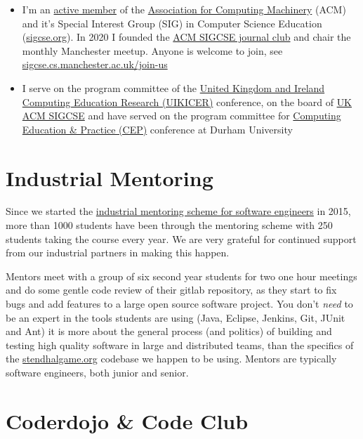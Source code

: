 \documentclass[
  12pt,
]{book}
\providecommand{\tightlist}{%
  \setlength{\itemsep}{0pt}\setlength{\parskip}{0pt}}
\begin{document}
\begin{itemize}
\tightlist
\item
  I'm an \href{https://dl.acm.org/profile/81350580198}{active member} of the \href{https://en.wikipedia.org/wiki/Association_for_Computing_Machinery}{Association for Computing Machinery} (ACM) and it's Special Interest Group (SIG) in Computer Science Education (\href{https://sigcse.org}{sigcse.org}). In 2020 I founded the \href{https://sigcse.cs.manchester.ac.uk/}{ACM SIGCSE journal club} and chair the monthly Manchester meetup. Anyone is welcome to join, see \href{https://sigcse.cs.manchester.ac.uk/join-us}{sigcse.cs.manchester.ac.uk/join-us}
\item
  I serve on the program committee of the \href{https://www.ukicer.com/}{United Kingdom and Ireland Computing Education Research (UIKICER)} conference, on the board of \href{https://uki-sigcse.acm.org/about}{UK ACM SIGCSE} and have served on the program committee for \href{http://community.dur.ac.uk/cep.conference}{Computing Education \& Practice (CEP)} conference at Durham University
\end{itemize}

\section{Industrial Mentoring}\label{industrial-mentoring}

Since we started the \href{https://www.cs.manchester.ac.uk/connect/business-engagement/industrial-mentoring/}{industrial mentoring scheme for software engineers} in 2015, more than 1000 students have been through the mentoring scheme with 250 students taking the course every year. We are very grateful for continued support from our industrial partners in making this happen.

Mentors meet with a group of six second year students for two one hour meetings and do some gentle code review of their gitlab repository, as they start to fix bugs and add features to a large open source software project. You don't \emph{need} to be an expert in the tools students are using (Java, Eclipse, Jenkins, Git, JUnit and Ant) it is more about the general process (and politics) of building and testing high quality software in large and distributed teams, than the specifics of the \href{https://stendhalgame.org/}{stendhalgame.org} codebase we happen to be using. Mentors are typically software engineers, both junior and senior.

\section{Coderdojo \& Code Club}\label{codeclub}
\end{document}
